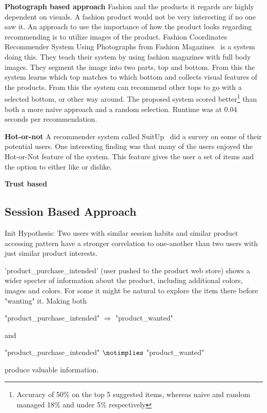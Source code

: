 \textbf{Photograph based approach}
Fashion and the products it regards are highly dependent on visuals.
A fashion product would not be very interesting if no one saw it.
An approach to use the importance of how the product looks regarding recommending is to utilize images of the product.
Fashion Coordinates Recommender System Using Photographs from Fashion Magazines~\cite{Iwata:2011} is a system doing this.
They teach their system by using fashion magazines with full body images.
They segment the image into two parts, top and bottom.
From this the system learns which top matches to which bottom and collects visual features of the products.
From this the system can recommend other tops to go with a selected bottom, or other way around.
The proposed system scored better\footnote{Accuracy of 50\% on the top 5 suggested items, whereas naive and random managed 18\% and under 5\% respectively} than both a more naive approach and a random selection.
Runtime was at 0.04 seconds per recommendation.

\textbf{Hot-or-not}
A recommender system called SuitUp~\cite{SuitUp} did a survey on some of their potential users.
One interesting finding was that many of the users enjoyed the Hot-or-Not feature of the system.
This feature gives the user a set of items and the option to either like or dislike.

\textbf{Trust based}



\subsection{Session Based Approach}
Init Hypothesis:
Two users with similar session habits and similar product accessing pattern
have a stronger correlation to one-another than two users with just similar
product interests.


'product\_purchase\_intended' (user pushed to the product web store) shows a
wider specter of information about the product, including additional colors,
images and colors.  For some it might be natural to explore the item there
before "wanting" it. Making both

"product\_purchase\_intended" $\Rightarrow$ "product\_wanted"

and

"product\_purchase\_intended" $\notimplies$ "product\_wanted"

produce valuable information.


